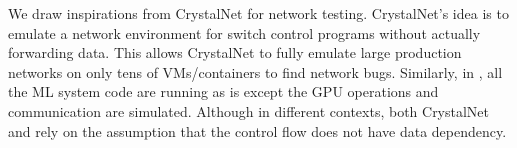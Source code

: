  We draw inspirations from CrystalNet \cite{liu2017crystalnet} for network testing. CrystalNet's idea is to emulate a network environment for switch control programs without actually forwarding data. This allows CrystalNet to fully emulate large production networks on only tens of VMs/containers to find network bugs.
Similarly, in \sys, all the ML system code are running as is except the GPU operations and communication are simulated. Although in different contexts, both CrystalNet and \sys rely on the assumption that the control flow does not have data dependency.
